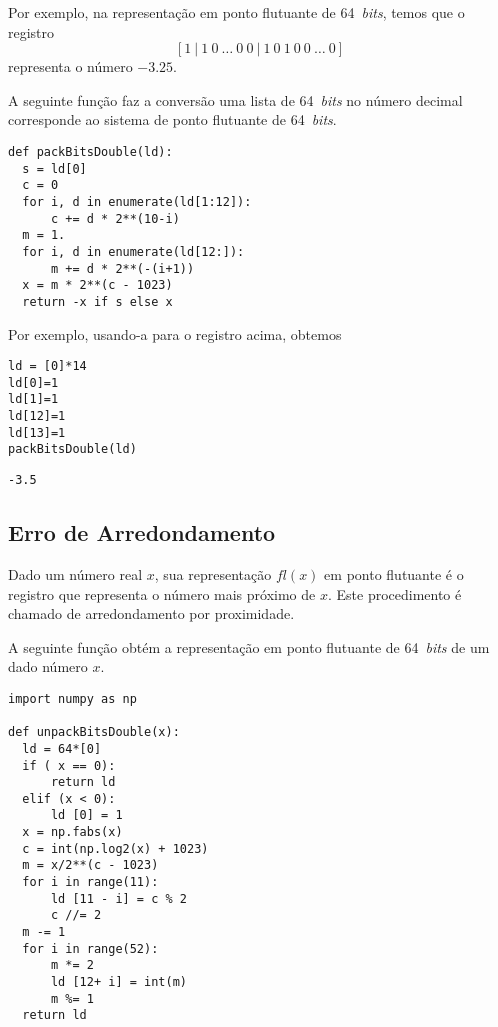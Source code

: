 \begin{ex}
  Por exemplo, na representação em ponto flutuante de 64~{\it bits}, temos que o registro
  \begin{equation}\label{eq:regfloat64}
    [1 ~ | ~ 1 ~ 0 ~ \ldots ~ 0 ~ 0 ~ | ~ 1 ~ 0 ~ 1 ~ 0 ~ 0 ~ \ldots ~ 0]
  \end{equation}
  representa o número $-3.25$.

  A seguinte função faz a conversão  uma lista de 64~{\it bits} no número decimal corresponde ao sistema de ponto flutuante de 64~{\it bits}.

\begin{lstlisting}[caption=packBitsDouble.py, label=cod:packBitsDouble]
def packBitsDouble(ld):
  s = ld[0]
  c = 0
  for i, d in enumerate(ld[1:12]):
      c += d * 2**(10-i)
  m = 1.
  for i, d in enumerate(ld[12:]):
      m += d * 2**(-(i+1))
  x = m * 2**(c - 1023)
  return -x if s else x
\end{lstlisting}

Por exemplo, usando-a para o registro acima, obtemos

\begin{lstlisting}
ld = [0]*14
ld[0]=1 
ld[1]=1 
ld[12]=1
ld[13]=1
packBitsDouble(ld)
\end{lstlisting}

\begin{verbatim}
-3.5
\end{verbatim}
\end{ex}

\subsection{Erro de Arredondamento}

Dado um número real $x$, sua representação $fl(x)$ em ponto flutuante é o registro que representa o número mais próximo de $x$. Este procedimento é chamado de arredondamento por proximidade.

A seguinte função obtém a representação em ponto flutuante de 64~{\it bits} de um dado número $x$.

\begin{lstlisting}[caption=unpackBitsDouble.py, label=cod:unpackBitsDouble]
import numpy as np

def unpackBitsDouble(x):
  ld = 64*[0]
  if ( x == 0):
      return ld
  elif (x < 0):
      ld [0] = 1
  x = np.fabs(x)
  c = int(np.log2(x) + 1023)
  m = x/2**(c - 1023)
  for i in range(11):
      ld [11 - i] = c % 2
      c //= 2
  m -= 1
  for i in range(52):
      m *= 2
      ld [12+ i] = int(m)
      m %= 1
  return ld
\end{lstlisting}

